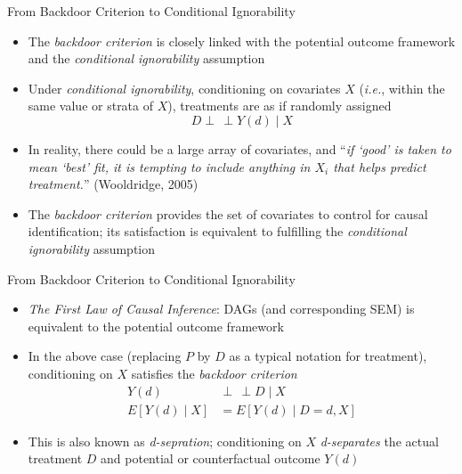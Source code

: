 \documentclass[aspectratio=1610,12pt,xcolor=dvipsnames]{beamer}
\newcommand{\indep}{\perp\!\!\!\, \perp}
\begin{document}
\begin{frame}{From Backdoor Criterion to Conditional Ignorability}

\begin{itemize}
    \item The \textit{backdoor criterion} is closely linked with the potential outcome framework and the \textit{conditional ignorability} assumption
    \item Under \textit{conditional ignorability}, conditioning on covariates $X$ (\textit{i.e.}, within the same value or strata of $X$), treatments are as if randomly assigned
    \[D \indep Y(d) \mid X \]
    \item In reality, there could be a large array of covariates, and ``\textit{if `good' is taken to mean `best' fit, it is tempting to include anything in $X_i$ that helps predict treatment.}'' (\textcolor{nagivation}{Wooldridge, 2005})
    \item The \textit{backdoor criterion} provides the set of covariates to control for causal identification; its satisfaction is equivalent to fulfilling the \textit{conditional ignorability} assumption
\end{itemize}
\end{frame}

\begin{frame}{From Backdoor Criterion to Conditional Ignorability}
\begin{itemize}
    \item \textit{The First Law of Causal Inference}: DAGs (and corresponding SEM) is equivalent to the potential outcome framework
    \item In the above case (replacing $P$ by $D$ as a typical notation for treatment), conditioning on $X$ satisfies the \textit{backdoor criterion}
    \begin{align*}
        Y(d) &\indep D \mid X \\
        E[Y(d) \mid X] &= E[Y(d) \mid D=d,  X]
    \end{align*}
    \item This is also known as \textit{d-sepration}; conditioning on $X$ \textit{d-separates} the actual treatment $D$ and potential or counterfactual outcome $Y(d)$
\end{itemize}
\end{frame}
\end{document}
